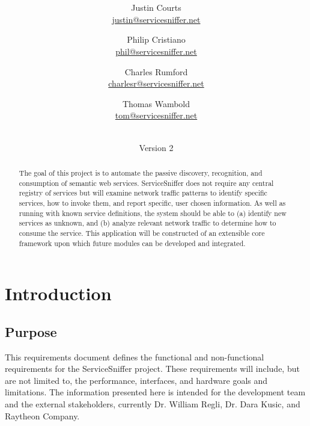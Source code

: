 \documentclass[titlepage]{article}
\title{\textbf{\mytitle}}
\author{
    Justin Courts \\\url{justin@servicesniffer.net}
    \and Philip Cristiano \\\url{phil@servicesniffer.net}
    \and Charles Rumford \\\url{charlesr@servicesniffer.net}
    \and Thomas Wambold \\\url{tom@servicesniffer.net}
}
\date{\mydate\\Version 2}
\begin{document}

\begin{figure}
    \vspace{-6em}
    \centering
    \vspace{-4em}
\end{figure}

\maketitle

\begin{abstract}
The goal of this project is to automate the passive discovery, recognition,
and consumption of semantic web services.  ServiceSniffer does not require
any central registry of services but will examine network traffic patterns
to identify specific services, how to invoke them, and report specific,
user chosen information.  As well as running with known service
definitions, the system should be able to (a) identify new services as
unknown, and (b) analyze relevant network traffic to determine how to
consume the service.  This application will be constructed of an extensible
core framework upon which future modules can be developed and integrated.
\end{abstract}

\setcounter{tocdepth}{4}
\tableofcontents
\pagebreak
{}

\listoftodos


\section{Introduction%
  \label{introduction}%
}


\subsection{Purpose%
  \label{purpose}%
}

This requirements document defines the functional and non-functional
requirements for the ServiceSniffer project.  These requirements will include,
but are not limited to, the performance, interfaces, and hardware goals and
limitations.  The information presented here is intended for the development
team and the external stakeholders, currently Dr. William Regli, Dr.
Dara Kusic, and Raytheon Company.
\end{document}
